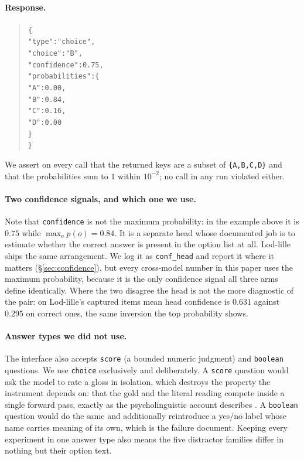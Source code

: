 \documentclass[11pt]{article}
\begin{document}
\paragraph{Response.}

\begin{quote}\scriptsize
\begin{alltt}
\{
  "type": "choice",
  "choice": "B",
  "confidence": 0.75,
  "probabilities": \{
    "A": 0.00,
    "B": 0.84,
    "C": 0.16,
    "D": 0.00
  \}
\}
\end{alltt}
\end{quote}

We assert on every call that the returned keys are a subset of
\texttt{\{A,B,C,D\}} and that the probabilities sum to $1$ within $10^{-2}$; no
call in any run violated either.

\paragraph{Two confidence signals, and which one we use.} Note that
\texttt{confidence} is not the maximum probability: in the example above it is
$0.75$ while $\max_o p(o) = 0.84$. It is a separate head whose documented job is
to estimate whether the correct answer is present in the option list at all.
Lod-lille ships the same arrangement. We log it as \texttt{conf\_head} and
report it where it matters (\S\ref{sec:confidence}), but every cross-model
number in this paper uses the maximum probability, because it is the only
confidence signal all three arms define identically. Where the two disagree the
head is not the more diagnostic of the pair: on Lod-lille's captured items mean
head confidence is $0.631$ against $0.295$ on correct ones, the same inversion
the top probability shows.

\paragraph{Answer types we did not use.} The interface also accepts
\texttt{score} (a bounded numeric judgment) and \texttt{boolean} questions. We
use \texttt{choice} exclusively and deliberately. A \texttt{score} question
would ask the model to rate a gloss in isolation, which destroys the property
the instrument depends on: that the gold and the literal reading compete inside
a single forward pass, exactly as the psycholinguistic account describes
\citep{cacciari1988comprehension,titone1999compositional}. A \texttt{boolean}
question would do the same and additionally reintroduce a yes/no label whose
name carries meaning of its own, which is the failure
\citet{sun2026typesafe} document. Keeping every experiment in one answer type
also means the five distractor families differ in nothing but their option text.
\end{document}
